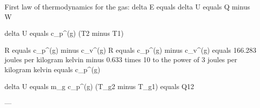 First law of thermodynamics for the gas:  
delta E equals delta U equals Q minus W  

delta U equals c_p^(g) (T2 minus T1)  

R equals c_p^(g) minus c_v^(g)  
R equals c_p^(g) minus c_v^(g) equals 166.283 joules per kilogram kelvin minus 0.633 times 10 to the power of 3 joules per kilogram kelvin equals c_p^(g)  

delta U equals m_g c_p^(g) (T_g2 minus T_g1) equals Q12  

---